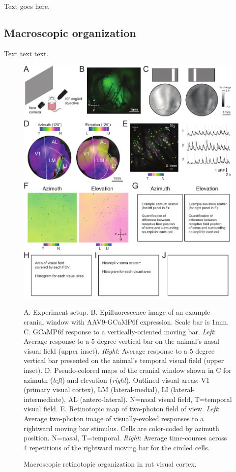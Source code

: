 \documentclass{article}
\begin{document}
Text goes here.

\subsection{Macroscopic organization}
Text text text.

\begin{figure}[ht]
  \includegraphics[width=\textwidth]{figures/retino.pdf}
  \caption{Macroscopic retinotopic organization in rat visual cortex.}
  \medskip
  \small
  A.  Experiment setup.  
  B.  Epifluorescence image of an example cranial window with AAV9-GCaMP6f expression. Scale bar is 1mm.  
  C.  GCaMP6f response to a vertically-oriented moving bar. \textit{Left}: Average response to a 5 degree vertical bar on the animal’s nasal visual field (upper inset). \textit{Right}: Average response to a 5 degree vertical bar presented on the animal’s temporal visual field (upper inset). 
  D.  Pseudo-colored maps of the cranial window shown in C for azimuth (\textit{left}) and elevation (\textit{right}). Outlined visual areas:  V1 (primary visual cortex), LM (lateral-medial), LI (lateral-intermediate), AL (antero-lateral). N=nasal visual field, T=temporal visual field. 
  E.  Retinotopic map of two-photon field of view.  \textit{Left}: Average two-photon image of visually-evoked responses to a rightward moving bar stimulus.  Cells are color-coded by azimuth position. N=nasal, T=temporal.  \textit{Right}:  Average time-courses across 4 repetitions of the rightward moving bar for the circled cells. 

\end{figure}
\end{document}
